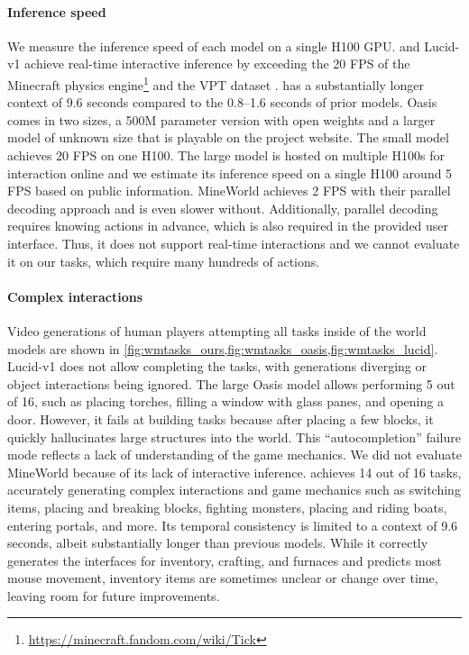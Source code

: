 \documentclass[11pt]{article}
\begin{document}


\pagebreak
\paragraph{Inference speed}

We measure the inference speed of each model on  a single H100 GPU.
\method and Lucid-v1 achieve real-time interactive inference by exceeding the 20 FPS of the Minecraft physics engine\footnote{\url{https://minecraft.fandom.com/wiki/Tick}} and the VPT dataset \citep{vpt}.
\method has a substantially longer context of 9.6 seconds compared to the 0.8--1.6 seconds of prior models.
Oasis comes in two sizes, a 500M parameter version with open weights and a larger model of unknown size that is playable on the project website.
The small model achieves 20 FPS on one H100.
The large model is hosted on multiple H100s for interaction online and we estimate its inference speed on a single H100 around 5 FPS based on public information.
MineWorld achieves 2 FPS with their parallel decoding approach and is even slower without.
Additionally, parallel decoding requires knowing actions in advance, which is also required in the provided user interface.
Thus, it does not support real-time interactions and we cannot evaluate it on our tasks, which require many hundreds of actions.



\enlargethispage{2\baselineskip}
\paragraph{Complex interactions}

Video generations of human players attempting all tasks inside of the world models are shown in \cref{fig:wmtasks_ours,fig:wmtasks_oasis,fig:wmtasks_lucid}.
Lucid-v1 does not allow completing the tasks, with generations diverging or object interactions being ignored.
The large Oasis model allows performing 5 out of 16, such as placing torches, filling a window with glass panes, and opening a door.
However, it fails at building tasks because after placing a few blocks, it quickly hallucinates large structures into the world.
This ``autocompletion'' failure mode reflects a lack of understanding of the game mechanics.
We did not evaluate MineWorld because of its lack of interactive inference.
\method achieves 14 out of 16 tasks, accurately generating complex interactions and game mechanics such as switching items, placing and breaking blocks, fighting monsters, placing and riding boats, entering portals, and more.
Its temporal consistency is limited to a context of 9.6 seconds, albeit substantially longer than previous models.
While it correctly generates the interfaces for inventory, crafting, and furnaces and predicts most mouse movement, inventory items are sometimes unclear or change over time, leaving room for future improvements.
\end{document}
